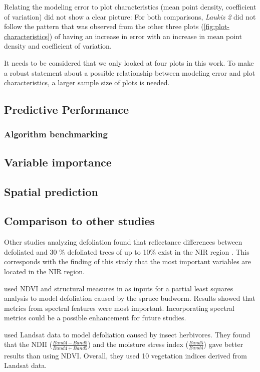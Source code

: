 \documentclass[review]{elsarticle}
\begin{document}
\noindent Relating the modeling error to plot characteristics (mean point density, coefficient of variation) did not show a clear picture: For both comparisons, \textit{Laukiz 2} did not follow the pattern that was observed from the other three plots (\autoref{fig:plot-characteristics}) of having an increase in error with an increase in mean point density and coefficient of variation.

It needs to be considered that we only looked at four plots in this work.
To make a robust statement about a possible relationship between modeling error and plot characteristics, a larger sample size of plots is needed.

\subsection{Predictive Performance}

\subsubsection{Algorithm benchmarking}

\subsection{Variable importance}

\subsection{Spatial prediction}


\subsection{Comparison to other studies}

\noindent Other studies analyzing defoliation found that reflectance differences between defoliated and 30 \% defoliated trees of up to 10\% exist in the \ac{NIR} region \citep{rengara2016}.
This corresponds with the finding of this study that the most important variables are located in the NIR region.

\cite{goodbody2018} used NDVI and structural measures in as inputs for a partial least squares analysis to model defoliation caused by the spruce budworm.
Results showed that metrics from spectral features were most important.
Incorporating spectral metrics could be a possible enhancement for future studies.

\cite{townsend2012} used Landsat data to model defoliation caused by insect herbivores.
They found that the \ac{NDII} ($\frac{Band 4 - Band 5}{Band 4 + Band 5}$) and the moisture stress index ($\frac{Band 5}{Band 4}$) gave better results than using NDVI.
Overall, they used 10 vegetation indices derived from Landsat data.
\end{document}
